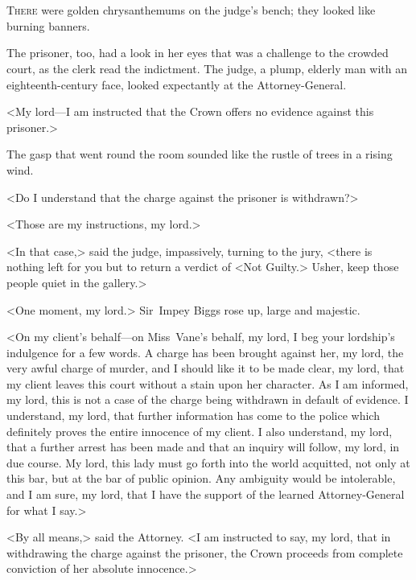 \chapter[Chapter \thechapter]{}

\lettrine{T}{here} were golden chrysanthemums on the judge's bench; they looked like burning banners.

\zz
The prisoner, too, had a look in her eyes that was a challenge to the crowded court, as the clerk read the indictment. The judge, a plump, elderly man with an eighteenth-century face, looked expectantly at the Attorney-General.

<My lord—I am instructed that the Crown offers no evidence against this prisoner.>

The gasp that went round the room sounded like the rustle of trees in a rising wind.

<Do I understand that the charge against the prisoner is withdrawn?>

<Those are my instructions, my lord.>

<In that case,> said the judge, impassively, turning to the jury, <there is nothing left for you but to return a verdict of <Not Guilty.> Usher, keep those people quiet in the gallery.>

<One moment, my lord.> Sir~Impey Biggs rose up, large and majestic.

<On my client's behalf—on Miss~Vane's behalf, my lord, I beg your lordship's indulgence for a few words. A charge has been brought against her, my lord, the very awful charge of murder, and I should like it to be made clear, my lord, that my client leaves this court without a stain upon her character. As I am informed, my lord, this is not a case of the charge being withdrawn in default of evidence. I understand, my lord, that further information has come to the police which definitely proves the entire innocence of my client. I also understand, my lord, that a further arrest has been made and that an inquiry will follow, my lord, in due course. My lord, this lady must go forth into the world acquitted, not only at this bar, but at the bar of public opinion. Any ambiguity would be intolerable, and I am sure, my lord, that I have the support of the learned Attorney-General for what I say.>

<By all means,> said the Attorney. <I am instructed to say, my lord, that in withdrawing the charge against the prisoner, the Crown proceeds from complete conviction of her absolute innocence.>


